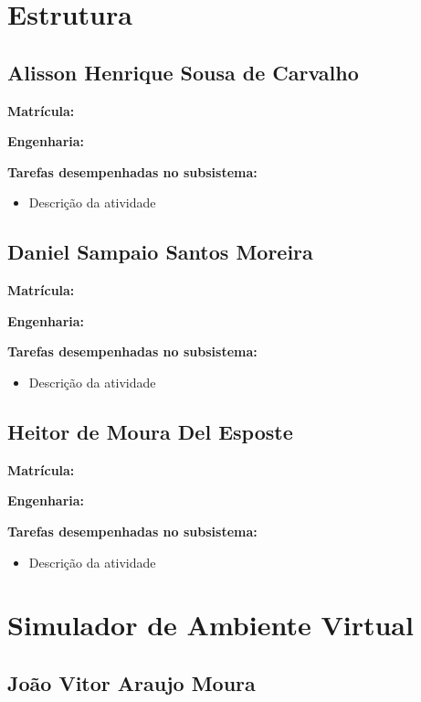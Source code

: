 \section{Estrutura}


\subsection{Alisson Henrique Sousa de Carvalho}

\textbf{Matrícula:}

\textbf{Engenharia:}

\textbf{Tarefas desempenhadas no subsistema:}

\begin{itemize}
\item Descrição da atividade
\end{itemize}


\subsection{Daniel Sampaio Santos Moreira}

\textbf{Matrícula:}

\textbf{Engenharia:}

\textbf{Tarefas desempenhadas no subsistema:}

\begin{itemize}
\item Descrição da atividade
\end{itemize}


\subsection{Heitor de Moura Del Esposte}

\textbf{Matrícula:}

\textbf{Engenharia:}

\textbf{Tarefas desempenhadas no subsistema:}

\begin{itemize}
\item Descrição da atividade
\end{itemize}

\section{Simulador de Ambiente Virtual}

\subsection{João Vitor Araujo Moura}

